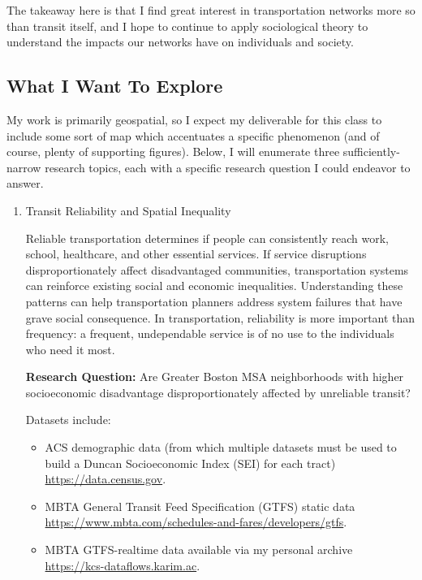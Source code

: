 \documentclass[12pt]{article}
\begin{document}
The takeaway here is that I find great interest in transportation networks more so than transit itself, and I hope to continue to apply sociological theory to understand the impacts our networks have on individuals and society.
\subsection{What I Want To Explore}
My work is primarily geospatial, so I expect my deliverable for this class to include some sort of map which accentuates a specific phenomenon (and of course, plenty of supporting figures).
Below, I will enumerate three sufficiently-narrow research topics, each with a specific research question I could endeavor to answer. 
\begin{enumerate}
    \item Transit Reliability and Spatial Inequality
        
        Reliable transportation determines if people can consistently reach work, school, healthcare, and other essential services.
        If service disruptions disproportionately affect disadvantaged communities, transportation systems can reinforce existing social and economic inequalities.
        Understanding these patterns can help transportation planners address system failures that have grave social consequence.
        In transportation, reliability is more important than frequency: a frequent, undependable service is of no use to the individuals who need it most.

    \textbf{Research Question:} Are Greater Boston MSA neighborhoods with higher socioeconomic disadvantage disproportionately affected by unreliable transit?

    Datasets include:
    \begin{itemize}
        \item ACS demographic data (from which multiple datasets must be used to build a Duncan Socioeconomic Index (SEI) for each tract) \\ \url{https://data.census.gov}.
        \item MBTA General Transit Feed Specification (GTFS) static data \\ \url{https://www.mbta.com/schedules-and-fares/developers/gtfs}.
        \item MBTA GTFS-realtime data available via my personal archive \\ \url{https://kcs-dataflows.karim.ac}.
    \end{itemize}    


\end{enumerate}
\end{document}
